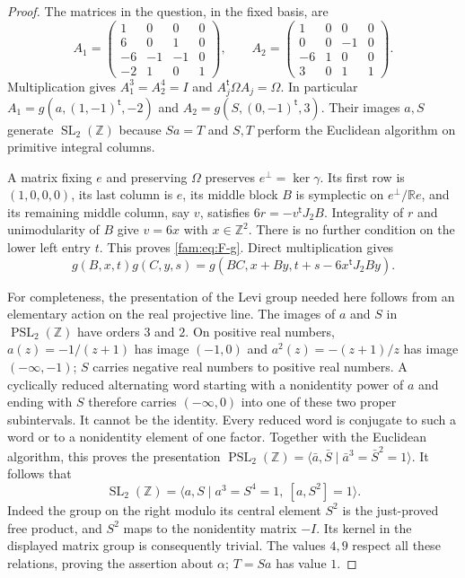 \begin{proof}
The matrices in the question, in the fixed basis, are
\[
 A_1=\begin{pmatrix}1&0&0&0\\6&0&1&0\\-6&-1&-1&0\\-2&1&0&1\end{pmatrix},
 \qquad
 A_2=\begin{pmatrix}1&0&0&0\\0&0&-1&0\\-6&1&0&0\\3&0&1&1\end{pmatrix}.
\]
Multiplication gives $A_1^3=A_2^4=I$ and
$A_j^{\mathsf t}\Omega A_j=\Omega$.  In particular
$A_1=g(a,(1,-1)^{\mathsf t},-2)$ and
$A_2=g(S,(0,-1)^{\mathsf t},3)$.  Their images $a,S$ generate
$\operatorname{SL}_2(\mathbb Z)$ because $Sa=T$ and $S,T$ perform the
Euclidean algorithm on primitive integral columns.

A matrix fixing $e$ and preserving $\Omega$ preserves
$e^{\perp}=\ker\gamma$.  Its first row is $(1,0,0,0)$, its last column is
$e$, its middle block $B$ is symplectic on
$e^{\perp}/\mathbb Re$, and its remaining middle column, say $v$, satisfies
$6r=-v^{\mathsf t}J_2B$.  Integrality of $r$ and unimodularity of $B$
give $v=6x$ with $x\in\mathbb Z^2$.  There is no further condition on
the lower left entry $t$.  This proves \eqref{fam:eq:F-g}.  Direct multiplication
gives
\begin{equation}\label{fam:eq:F-law}
 g(B,x,t)g(C,y,s)
 =g(BC,x+By,t+s-6x^{\mathsf t}J_2By).
\end{equation}

For completeness, the presentation of the Levi group needed here follows
from an elementary action on the real projective line.  The images of $a$
and $S$ in $\operatorname{PSL}_2(\mathbb Z)$ have orders $3$ and $2$.
On positive real numbers, $a(z)=-1/(z+1)$ has image $(-1,0)$ and
$a^2(z)=-(z+1)/z$ has image $(-\infty,-1)$; $S$ carries negative real
numbers to positive real numbers.  A cyclically reduced alternating word
starting with a nonidentity power of $a$ and ending with $S$ therefore
carries $(-\infty,0)$ into one of these two proper subintervals.  It cannot
be the identity.  Every reduced word is conjugate to such a word or to a
nonidentity element of one factor.  Together with the Euclidean algorithm,
this proves the presentation
$\operatorname{PSL}_2(\mathbb Z)=\langle\bar a,\bar S\mid
\bar a^3=\bar S^2=1\rangle$.  It follows that
\begin{equation}\label{fam:eq:F-SLpresentation}
 \operatorname{SL}_2(\mathbb Z)=
 \langle a,S\mid a^3=S^4=1,\ [a,S^2]=1\rangle.
\end{equation}
Indeed the group on the right modulo its central element $S^2$ is the
just-proved free product, and $S^2$ maps to the nonidentity matrix $-I$.
Its kernel in the displayed matrix group is consequently trivial.
The values $4,9$ respect all these relations, proving the assertion about
$\alpha$; $T=Sa$ has value $1$.


\end{proof}
